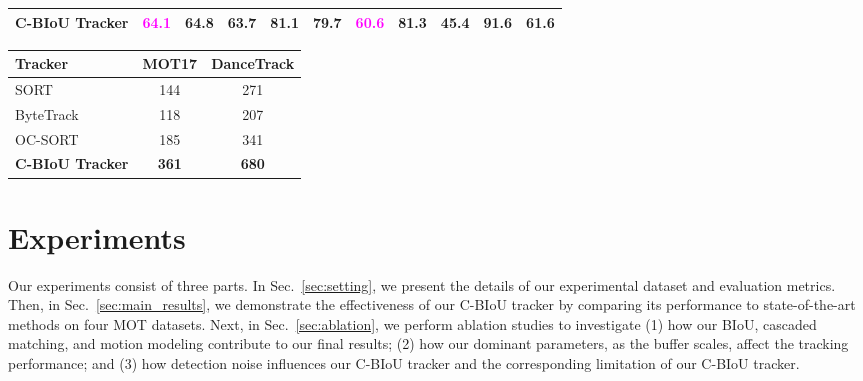 \documentclass[journal]{IEEEtran}
\begin{document}
\begin{table*}[h!]
\begin{minipage}[t]{.65\textwidth}
\begin{tabular}{l c c c c c  c c c c c }
         \textbf{C-BIoU Tracker} & \textcolor{magenta}{\textbf{64.1}} & \textbf{64.8} & \textbf{63.7} & \textbf{81.1} & \textbf{79.7} & \textcolor{magenta}{\textbf{60.6}}  & 81.3  & \textbf{45.4}  & 91.6 & \textbf{61.6} \\
      \bottomrule
     \end{tabular}
     \label{table:mot17_dancetrack_test}
   \end{minipage}
   \hfill
   \begin{minipage}[t]{.33\textwidth}
      \caption{\textbf{Comparison of the tracking inference speed (w/o the detection part) using an Intel Xeon Silver 4216 CPU}. The unit is FPS (Frames Per Second). Because our C-BIoU utilizes the average speed of recent frames other than the Kalman filter for its motion estimation, it is faster than other trackers. Note that, the speed of tracker is proportional to the number of tracking objects, and when the number of objects increases, the speed of the tracker drops.}
      \centering
      \setlength{\tabcolsep}{3pt}
      \footnotesize
      \begin{tabular}{ l cc}
      \toprule
      Tracker & MOT17 & DanceTrack \\
      \midrule
      SORT~\cite{SORT} &144  &271 \\
      ByteTrack~\cite{bytetrack} & 118 & 207 \\
      OC-SORT~\cite{cao2022observation} & 185 & 341  \\
      \textbf{C-BIoU Tracker} & \textbf{361}  & \textbf{680}  \\
      \bottomrule
     \end{tabular}
     \label{table:inference_speed}
   \end{minipage}
 \end{table*}





\section{Experiments}

Our experiments consist of three parts. In Sec.~\ref{sec:setting}, we present the details of our experimental dataset and evaluation metrics. Then, in Sec.~\ref{sec:main_results}, we demonstrate the effectiveness of our C-BIoU tracker by comparing its performance to state-of-the-art methods on four MOT datasets. Next, in Sec.~\ref{sec:ablation}, we perform ablation studies to investigate (1) how our BIoU, cascaded matching, and motion modeling contribute to our final results; (2) how our dominant parameters, as the buffer scales, affect the tracking performance; and (3) how detection noise influences our C-BIoU tracker and the corresponding limitation of our C-BIoU tracker. 
\end{document}
